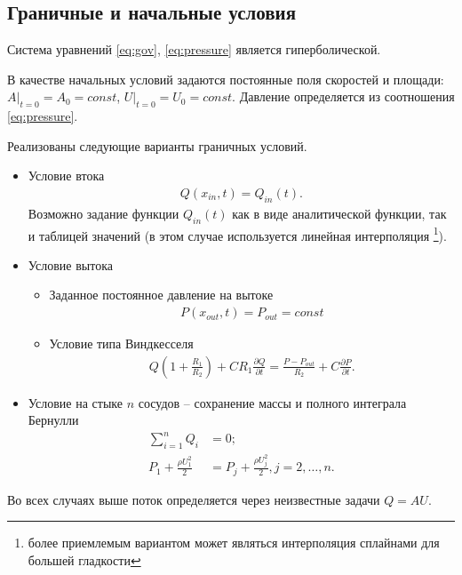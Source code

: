 \documentclass[12pt]{article}
\begin{document}
\subsection{Граничные и начальные условия}\label{sec:conditions}

Система уравнений \eqref{eq:gov}, \eqref{eq:pressure} является гиперболической.

В качестве начальных условий задаются постоянные поля скоростей и площади: $A|_{t=0} = A_0 = const$, $U|_{t=0} = U_0 = const$. Давление определяется из соотношения \eqref{eq:pressure}.

Реализованы следующие варианты граничных условий.

\begin{itemize}
	\item Условие втока
		\begin{align}\label{eq:inlet}
			Q(x_{in},t) = Q_{in}(t).
		\end{align}
		Возможно задание функции $Q_{in}(t)$ как в виде аналитической функции, так и таблицей значений (в этом случае используется линейная интерполяция \footnote{более приемлемым вариантом может являться интерполяция сплайнами для большей гладкости}).
	\item Условие вытока
		\begin{itemize}
			\item Заданное постоянное давление на вытоке
				\begin{align}\label{eq:outflow_pressure}
					P(x_{out}, t) = P_{out} = const
				\end{align}
			\item Условие типа Виндкесселя
				\begin{align}\label{eq:windkessel}
					Q\left(1+\frac{R_1}{R_2}\right) + C R_1 \frac{\partial Q}{\partial t} = \frac{P - P_{out}}{R_2} + C \frac{\partial P}{\partial t}.
				\end{align}
		\end{itemize}
	\item Условие на стыке $n$ сосудов -- сохранение массы и полного интеграла Бернулли
		\begin{align}\label{eq:junction}
			\sum\limits_{i=1}^{n} Q_i &= 0; \\
			P_1 + \frac{\rho U_1^2}{2} &= P_j + \frac{\rho U_j^2}{2}, j = 2, \dots, n.
		\end{align}
\end{itemize}

Во всех случаях выше поток определяется через неизвестные задачи $Q = AU$.
\end{document}
